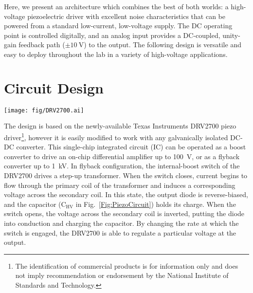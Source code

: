 \documentclass[aip,rsi,reprint]{revtex4-1} %
\begin{document}
Here, we present an architecture which combines the best of both worlds: a high-voltage piezoelectric driver with excellent noise characteristics that can be powered from a standard low-current, low-voltage supply.
The DC operating point is controlled digitally, and an analog input provides a DC-coupled, unity-gain feedback path ($\pm\SI{10}{\volt}$) to the output.
The following design is versatile and easy to deploy throughout the lab in a variety of high-voltage applications.


\section{Circuit Design}
\label{Sec:Circuit}

\begin{figure*}[t]
\texttt{[image: fig/DRV2700.ai]}
\caption{Schematic of the high voltage stabilization.
The voltage HV is generated using a Texas Instruments DRV2700 high voltage driver in flyback configuration (see Fig.~\ref{Fig:DRV2700}).
A fast, very high slew-rate op-amp senses the output voltage across $R_1$ and $R_2$, and servos it by modulating the node at ``HV floating gnd''.
The $V_{\text{DC}}$ gain is set by $\left(1+R_1/R_2\right)$, while the modulation gain is set by $-R_{\text{mod}}/R_1$.
The capacitor linking the floating ground node to the output allows the op-amp to remove residual switching noise and stabilize the DC output according to the transfer function given in Eq.~(\ref{Eq:PiezoTransfer}). -- Add back in second set of shunt caps!\label{Fig:PiezoCircuit}}
\end{figure*}

The design is based on the newly-available Texas Instruments DRV2700 piezo driver\footnote{The identification of commercial products is for information only and does not imply recommendation or endorsement by the National Institute of Standards and Technology.}, however it is easily modified to work with any galvanically isolated DC-DC converter.
This single-chip integrated circuit (IC) can be operated as a boost converter to drive an on-chip differential amplifier up to \SI{100}{\volt}, or as a flyback converter up to \SI{1}{\kilo\volt}.
In flyback configuration, the internal-boost switch of the DRV2700 drives a step-up transformer.
When the switch closes, current begins to flow through the primary coil of the transformer and induces a corresponding voltage across the secondary coil.
In this state, the output diode is reverse-biased, and the capacitor ($\text{C}_{\text{HV}}$ in Fig.~\ref{Fig:PiezoCircuit}) holds its charge.
When the switch opens, the voltage across the secondary coil is inverted, putting the diode into conduction and charging the capacitor.
By changing the rate at which the switch is engaged, the DRV2700 is able to regulate a particular voltage at the output.
\end{document}
